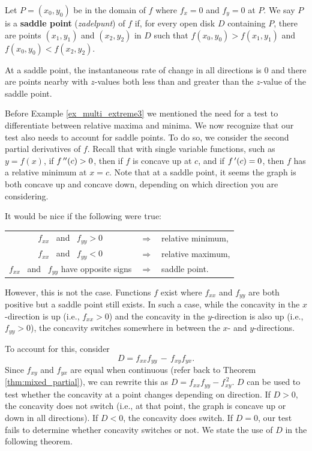 \begin{definition}\label{def:saddle_point}
Let $P=(x_0,y_0)$ be in the domain of $f$ where $f_x=0$ and $f_y=0$ at $P$. We say $P$ is a \textbf{saddle point} (\textit{zadelpunt}) of $f$ if, for every open disk $D$ containing $P$, there are points $(x_1,y_1)$ and $(x_2,y_2)$ in $D$ such that $f(x_0,y_0)>f(x_1,y_1)$ and $f(x_0,y_0)<f(x_2,y_2)$.
\end{definition}

At a saddle point, the instantaneous rate of change in all directions is 0 and there are points nearby with $z$-values both less than and greater than the $z$-value of the saddle point.

Before Example \ref{ex_multi_extreme3} we mentioned the need for a test to differentiate between relative maxima and minima. We now recognize that our test also needs to account for saddle points. To do so, we consider the second partial derivatives of $f$. Recall that with single variable functions, such as $y=f(x)$, if $f\,''(c)>0$, then if $f$ is concave up at $c$, and if $f\,'(c) =0$, then $f$ has a relative minimum at $x=c$.  Note that at a saddle point, it seems the graph is both concave up and concave down, depending on which direction you are considering.

It would be nice if the following were true:
\begin{center}
	\begin{tabular}{ccl}
	$f_{xx}\,\,\,$ and $\,\,\,f_{yy} >0$ & $\Rightarrow$ & relative minimum,\\
	$f_{xx}\,\,\,$ and $\,\,\,f_{yy} <0$ & $\Rightarrow$ & relative maximum,\\
	$f_{xx}\,\,\,$ and $\,\,\,f_{yy}$ have opposite signs & $\Rightarrow$ & saddle point.
	\end{tabular}
\end{center}

However, this is not the case. Functions $f$ exist where $f_{xx}$ and $f_{yy}$ are both positive  but a saddle point still exists. In such a case, while the concavity in the $x$-direction is up (i.e., $f_{xx}>0$) and the concavity in the $y$-direction is also up (i.e., $f_{yy}>0$), the concavity switches somewhere in between the $x$- and $y$-directions.

To account for this, consider 
$$D = f_{xx}f_{yy} \, - \, f_{xy}f_{yx}.$$
 Since $f_{xy}$ and $f_{yx}$ are equal when continuous (refer back to Theorem \ref{thm:mixed_partial}), we can rewrite this as $D = f_{xx}f_{yy}-f_{xy}^{\,2}$. $D$ can be used to test whether the concavity at a point changes depending on direction. If $D>0$, the concavity does not switch (i.e., at that point, the graph is concave up or down in all directions). If $D<0$, the concavity does switch. If $D=0$, our test fails to determine whether concavity switches or not. We state the use of $D$ in the following theorem.


